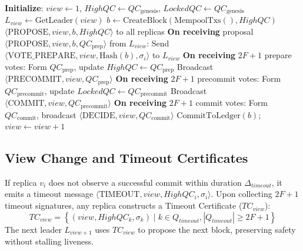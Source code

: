 \documentclass[10pt,journal,compsoc,twocolumn]{IEEEtran}
\begin{document}
\begin{algorithm}[h]
\caption{HotStuff-2 Three-Phase Replica Execution Routine}
\label{alg:hotstuff}
\begin{algorithmic}[1]
\STATE \textbf{Initialize}: $view \leftarrow 1$, $HighQC \leftarrow QC_{\text{genesis}}$, $LockedQC \leftarrow QC_{\text{genesis}}$
    \STATE $L_{view} \leftarrow \text{GetLeader}(view)$
        \STATE $b \leftarrow \text{CreateBlock}(\text{MempoolTxs}(), HighQC)$
        \STATE {} $\langle \text{PROPOSE}, view, b, HighQC \rangle$ to all replicas
    \ENDIF
    \STATE \textbf{On receiving} proposal $\langle \text{PROPOSE}, view, b, QC_{\text{prep}} \rangle$ from $L_{view}$:
        \STATE Send $\langle \text{VOTE\_PREPARE}, view, \text{Hash}(b), \sigma_i \rangle$ to $L_{view}$
    \ENDIF
    \STATE \textbf{On receiving} $2F+1$ prepare votes:
    \STATE Form $QC_{\text{prep}}$, update $HighQC \leftarrow QC_{\text{prep}}$
    \STATE Broadcast $\langle \text{PRECOMMIT}, view, QC_{\text{prep}} \rangle$
    \STATE \textbf{On receiving} $2F+1$ precommit votes:
    \STATE Form $QC_{\text{precommit}}$, update $LockedQC \leftarrow QC_{\text{precommit}}$
    \STATE Broadcast $\langle \text{COMMIT}, view, QC_{\text{precommit}} \rangle$
    \STATE \textbf{On receiving} $2F+1$ commit votes:
    \STATE Form $QC_{\text{commit}}$, broadcast $\langle \text{DECIDE}, view, QC_{\text{commit}} \rangle$
    \STATE $\text{CommitToLedger}(b)$; $view \leftarrow view + 1$
\ENDWHILE
\end{algorithmic}
\end{algorithm}

\subsection{View Change and Timeout Certificates}
If replica $v_i$ does not observe a successful commit within duration $\Delta_{timeout}$, it emits a timeout message $\langle \text{TIMEOUT}, view, HighQC_i, \sigma_i \rangle$. Upon collecting $2F+1$ timeout signatures, any replica constructs a Timeout Certificate ($TC_{view}$):
\begin{equation}
TC_{view} = \left\{ (view, HighQC_k, \sigma_k) \;\Big|\; k \in Q_{timeout}, |Q_{timeout}| \ge 2F+1 \right\}
\label{eq:tc}
\end{equation}
The next leader $L_{view+1}$ uses $TC_{view}$ to propose the next block, preserving safety without stalling liveness.
\end{document}
